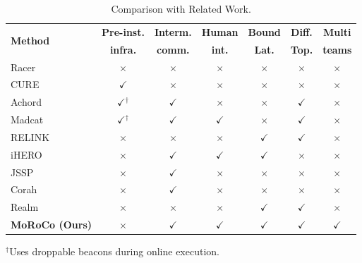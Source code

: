 \newcommand{\cmark}{$\checkmark$}
\newcommand{\xmark}{$\times$}

\begin{table}[t]
  \centering
  \caption{Comparison with Related Work.}
  \label{ch01:tab:feature_comparison}
  \vspace{-2mm}
  \setlength{\tabcolsep}{3pt}
  \begin{tabular*}{0.98\columnwidth}{@{\extracolsep{\fill}}lcccccc@{}}
    \toprule
    \multirow{2}{*}{\textbf{Method}} &
    {\footnotesize \textbf{Pre-inst.}} &
    {\footnotesize \textbf{Interm.}} &
    {\footnotesize \textbf{Human}} &
    {\footnotesize \textbf{Bound}} &
    {\footnotesize \textbf{Diff.}} &
    {\footnotesize \textbf{Multi}} \\[-0.8ex]
    & {\footnotesize \textbf{infra.}} &
      {\footnotesize \textbf{comm.}} &
      {\footnotesize \textbf{int.}} &
      {\footnotesize \textbf{Lat.}} &
      {\footnotesize \textbf{Top.}} &
      {\footnotesize \textbf{teams}} \\[-0.2ex]
      \midrule
Racer~\cite{zhou2023racer}     & \xmark & \xmark & \xmark & \xmark & \xmark & \xmark \\
CURE~\cite{bi2023cure}         & \cmark & \xmark & \xmark & \xmark & \xmark & \xmark \\
Achord~\cite{saboia2022achord} & \cmark$^{\dagger}$ & \cmark & \xmark & \xmark & \cmark & \xmark \\
Madcat~\cite{riley2023fielded} & \cmark$^{\dagger}$ & \cmark & \cmark & \xmark & \cmark & \xmark \\
    RELINK~\cite{xia2023relink}    & \xmark & \xmark & \xmark & \cmark & \cmark & \xmark \\
iHERO~\cite{tian2024ihero}     & \xmark & \cmark & \cmark & \cmark & \xmark & \xmark \\
    JSSP~\cite{Ani2024iros}        & \xmark & \cmark & \xmark & \xmark & \xmark & \xmark \\
    Corah~\cite{8633953}           & \xmark & \cmark & \xmark & \xmark & \xmark & \xmark \\
    Realm~\cite{11128211}          & \xmark & \xmark & \xmark & \cmark & \cmark & \xmark \\
    \midrule
    \textbf{MoRoCo (Ours)}         & \xmark & \cmark & \cmark & \cmark & \cmark & \cmark \\
    \bottomrule
  \end{tabular*}

  \vspace{2pt}
  \raggedright
  \footnotesize $^{\dagger}$Uses droppable beacons during online execution.
\end{table}

